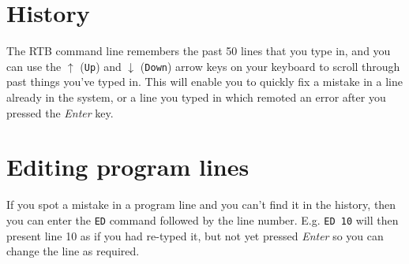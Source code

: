 \section{History}
The RTB command line remembers the past 50 lines that you type in,
and you can use the $\uparrow$ ({\tt Up}) and $\downarrow$ ({\tt Down})
arrow keys on your keyboard to scroll through past things you've typed
in. This will enable you to quickly fix a mistake in a line already
in the system, or a line you typed in which remoted an error after you
pressed the {\em Enter} key.

\section{Editing program lines}
If you spot a mistake in a program line and you can't find it in the
history, then you can enter the {\tt ED} command followed by the line
number. E.g. {\tt ED 10} will then present line 10 as if you had
re-typed it, but not yet pressed {\em Enter} so you can change the line
as required.
